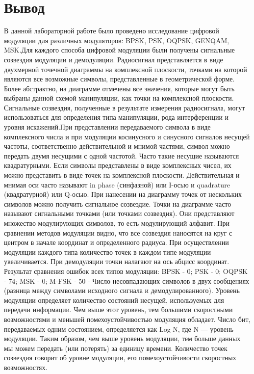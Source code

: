 \documentclass[10pt,a4paper]{report}
\begin{document}
\section{Вывод}
В данной лабораторной работе было проведено исследование цифровой модуляции для различных модуляторов: BPSK, PSK, OQPSK, GENQAM, MSK.Для каждого способа цифровой модуляции
были получены сигнальные созвездия модуляции и демодуляции. Радиосигнал представляется в виде двухмерной точечной диаграммы на комплексной плоскости, точками на которой 
являются все возможные символы, представленные в геометрической форме. Более абстрактно, на диаграмме отмечены все значения, которые могут быть выбраны данной схемой 
манипуляции, как точки на комплексной плоскости. Сигнальные созвездия, полученные в результате измерения радиосигнала, могут использоваться для определения типа манипуляции,
 рода интерференции и уровня искажений.При представлении передаваемого символа в виде комплексного числа и при модуляции косинусного и синусного сигналов несущей частоты, 
соответственно действительной и мнимой частями, символ можно передать двумя несущими с одной частотой. Часто такие несущие называются квадратурными.
 Если символы представлены в виде комплексных чисел, их можно представить в виде точек на комплексной плоскости. Действительная и мнимая оси часто называют in phase (синфазной)
 или I-осью и quadrature (квадратурной) или Q-осью. При нанесении на диаграмму точек от нескольких символов можно получить сигнальное созвездие. Точки на диаграмме часто
 называют сигнальными точками (или точками созвездия). Они представляют множество модулирующих символов, то есть модулирующий алфавит.
При сравнении методов модуляции видно, что все созвездия наносятся на круг с центром в начале координат и определенного радиуса. При осуществлении модуляции каждого типа 
количество точек в каждом типе модуляции увеличивается. При демодуляции точки налагают на ось абцисс координат.
Результат сравнения ошибок всех типов модуляции:
BPSK - 0; PSK - 0; OQPSK - 74; MSK - 0; M-FSK - 50 - Число несовпадающих символов в двух сообщениях (разница между символами исходного сигнала и демодулированного).
Уровень модуляции определяет количество состояний несущей, используемых для передачи информации. Чем выше этот уровень, тем большими скоростными возможностями и меньшей
 помехоустойчивостью модуляция обладает. Число бит, передаваемых одним состоянием, определяется как Log N, где N — уровень модуляции. Таким образом, чем выше уровень 
модуляции, тем больше данных мы можем передать (или потерять) за единицу времени. Количество точек созвездия говорит об уровне модуляции, его помехоустойчивости
скоростных возможностях.
\end{document}
